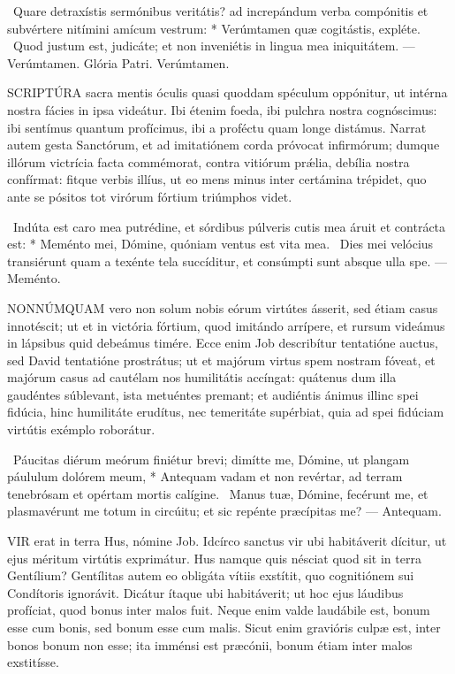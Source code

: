 \R\ Quare detraxístis sermónibus veritátis? ad increpándum verba compónitis et subvértere nitímini amícum vestrum: * Verúmtamen quæ cogitástis, expléte. \V\ Quod justum est, judicáte; et non inveniétis in lingua mea iniquitátem. — Verúmtamen. Glória Patri. Verúmtamen.




\lettrine[lines=2]{S}{CRIPTÚRA} sacra mentis óculis quasi quoddam spéculum oppónitur, ut intérna nostra fácies in ipsa videátur. Ibi étenim foeda, ibi pulchra nostra cognóscimus: ibi sentímus quantum profícimus, ibi a proféctu quam longe distámus. Narrat autem gesta Sanctórum, et ad imitatiónem corda próvocat infirmórum; dumque illórum victrícia facta commémorat, contra vitiórum prǽlia, debília nostra confírmat: fitque verbis illíus, ut eo mens minus inter certámina trépidet, quo ante se pósitos tot virórum fórtium triúmphos videt.

\R\ Indúta est caro mea putrédine, et sórdibus púlveris cutis mea áruit et contrácta est: * Meménto mei, Dómine, quóniam ventus est vita mea. \V\ Dies mei velócius transiérunt quam a texénte tela succíditur, et consúmpti sunt absque ulla spe. — Meménto.


\lettrine[lines=2]{N}{ONNÚMQUAM} vero non solum nobis eórum virtútes ásserit, sed étiam casus innotéscit; ut et in victória fórtium, quod imitándo arrípere, et rursum videámus in lápsibus quid debeámus timére. Ecce enim Job describítur tentatióne auctus, sed David tentatióne prostrátus; ut et majórum virtus spem nostram fóveat, et majórum casus ad cautélam nos humilitátis accíngat: quátenus dum illa gaudéntes súblevant, ista metuéntes premant; et audiéntis ánimus illinc spei fidúcia, hinc humilitáte erudítus, nec temeritáte supérbiat, quia ad spei fidúciam virtútis exémplo roborátur.

\R\ Páucitas diérum meórum finiétur brevi; dimítte me, Dómine, ut plangam páululum dolórem meum, * Antequam vadam et non revértar, ad terram tenebrósam et opértam mortis calígine. \V\ Manus tuæ, Dómine, fecérunt me, et plasmavérunt me totum in circúitu; et sic repénte præcípitas me? — Antequam.


\lettrine[lines=2]{V}{IR} erat in terra Hus, nómine Job. Idcírco sanctus vir ubi habitáverit dícitur, ut ejus méritum virtútis exprimátur. Hus namque quis nésciat quod sit in terra Gentílium? Gentílitas autem eo obligáta vítiis exstítit, quo cognitiónem sui Condítoris ignorávit. Dicátur ítaque ubi habitáverit; ut hoc ejus láudibus profíciat, quod bonus inter malos fuit. Neque enim valde laudábile est, bonum esse cum bonis, sed bonum esse cum malis. Sicut enim gravióris culpæ est, inter bonos bonum non esse; ita imménsi est præcónii, bonum étiam inter malos exstitísse.

